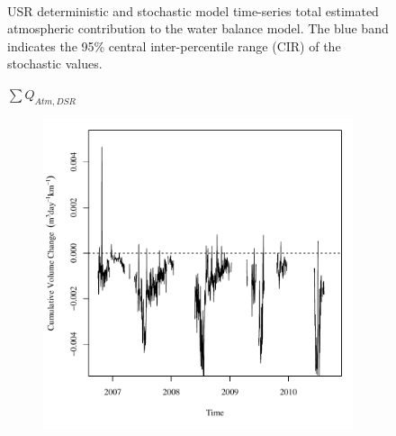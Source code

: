 \begin{linenumbers}
\begin{landscape}
\begin{figure}
\begin{subfigure}{0.7\textwidth}
		\end{subfigure}\\
		\caption[USR deterministic and stochastic model time-series total estimated atmospheric contribution to the water balance model.]{USR deterministic and stochastic model time-series total estimated atmospheric contribution to the water balance model.  The blue band indicates the 95\% central inter-percentile range (CIR) of the stochastic values.}
		\label{fig:reachAtm_US}
	\end{figure}
\end{landscape}
\subfiguretop
\begin{landscape}
	\begin{figure}
		\centering
		$ \displaystyle \sum Q_{Atm,DSR} $
		\begin{subfigure}{0.7\textwidth}
			\centering
			\includegraphics[width=\tableCustomSize]{"Figures/Results_DSR/Deterministic/Balance Water - atm"}
		\end{subfigure}%
		\begin{subfigure}{0.7\textwidth}
			\centering

\end{subfigure}
\end{figure}
\end{landscape}
\end{linenumbers}
